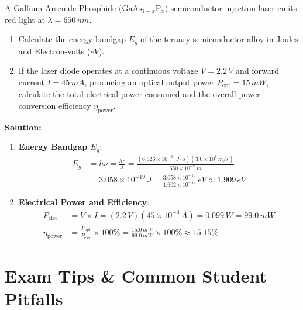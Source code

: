 \begin{example}
A Gallium Arsenide Phosphide ($\text{GaAs}_{1-x}\text{P}_x$) semiconductor injection laser emits red light at $\lambda = 650\,\si{nm}$.
\begin{enumerate}
    \item Calculate the energy bandgap $E_g$ of the ternary semiconductor alloy in Joules and Electron-volts ($\si{eV}$).
    \item If the laser diode operates at a continuous voltage $V = 2.2\,\si{V}$ and forward current $I = 45\,\si{mA}$, producing an optical output power $P_{\text{opt}} = 15\,\si{mW}$, calculate the total electrical power consumed and the overall power conversion efficiency $\eta_{\text{power}}$.
\end{enumerate}

\textbf{Solution:}
\begin{enumerate}
    \item \textbf{Energy Bandgap $E_g$}:
    \begin{align*}
        E_g &= h\nu = \frac{hc}{\lambda} = \frac{(6.626 \times 10^{-34}\,\si{J\cdot s})(3.0 \times 10^8\,\si{m/s})}{650 \times 10^{-9}\,\si{m}} \\
        &= 3.058 \times 10^{-19}\,\si{J} = \frac{3.058 \times 10^{-19}}{1.602 \times 10^{-19}}\,\si{eV} \approx 1.909\,\si{eV}
    \end{align*}
    
    \item \textbf{Electrical Power and Efficiency}:
    \begin{align*}
        P_{\text{elec}} &= V \times I = (2.2\,\si{V})(45 \times 10^{-3}\,\si{A}) = 0.099\,\si{W} = 99.0\,\si{mW} \\
        \eta_{\text{power}} &= \frac{P_{\text{opt}}}{P_{\text{elec}}} \times 100\% = \frac{15.0\,\si{mW}}{99.0\,\si{mW}} \times 100\% \approx 15.15\%
    \end{align*}
\end{enumerate}
\end{example}

\section{Exam Tips \& Common Student Pitfalls}

